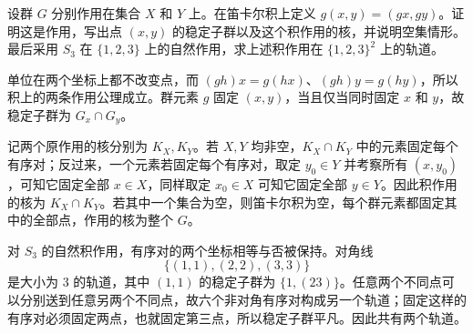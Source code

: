 \begin{exercise}\label{b1:ex:04-8}
	设群 \(G\) 分别作用在集合 \(X\) 和 \(Y\) 上。在笛卡尔积上定义 \(g(x,y)=(gx,gy)\)。证明这是作用，写出点 \((x,y)\) 的稳定子群以及这个积作用的核，并说明空集情形。最后采用 \(S_3\) 在 \(\{1,2,3\}\) 上的自然作用，求上述积作用在 \(\{1,2,3\}^2\) 上的轨道。
\end{exercise}
\begin{solution}
	单位在两个坐标上都不改变点，而 \((gh)x=g(hx)\)、\((gh)y=g(hy)\)，所以积上的两条作用公理成立。群元素 \(g\) 固定 \((x,y)\)，当且仅当同时固定 \(x\) 和 \(y\)，故稳定子群为 \(G_x\cap G_y\)。

	记两个原作用的核分别为 \(K_X,K_Y\)。若 \(X,Y\) 均非空，\(K_X\cap K_Y\) 中的元素固定每个有序对；反过来，一个元素若固定每个有序对，取定 \(y_0\in Y\) 并考察所有 \((x,y_0)\)，可知它固定全部 \(x\in X\)，同样取定 \(x_0\in X\) 可知它固定全部 \(y\in Y\)。因此积作用的核为 \(K_X\cap K_Y\)。若其中一个集合为空，则笛卡尔积为空，每个群元素都固定其中的全部点，作用的核为整个 \(G\)。

	对 \(S_3\) 的自然积作用，有序对的两个坐标相等与否被保持。对角线
	\[
		\bigl\{(1,1),(2,2),(3,3)\bigr\}
	\]
	是大小为 \(3\) 的轨道，其中 \((1,1)\) 的稳定子群为 \(\bigl\{1,(23)\bigr\}\)。任意两个不同点可以分别送到任意另两个不同点，故六个非对角有序对构成另一个轨道；固定这样的有序对必须固定两点，也就固定第三点，所以稳定子群平凡。因此共有两个轨道。
\end{solution}

